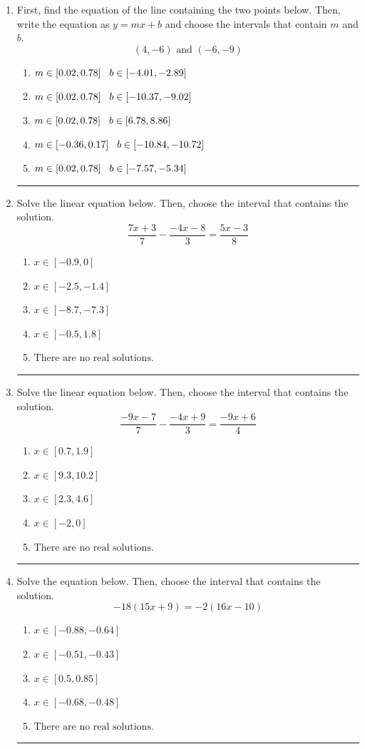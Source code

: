 \documentclass[14pt]{extbook}
\newcommand{\litem}[1]{\item#1\hspace*{-1cm}\rule{\textwidth}{0.4pt}}
\begin{document}
\begin{enumerate}
{\begin{enumerate}[label=\Alph*.]
\end{enumerate} }
\litem{
First, find the equation of the line containing the two points below. Then, write the equation as $ y=mx+b $ and choose the intervals that contain $m$ and $b$.\[ (4, -6) \text{ and } (-6, -9) \]\begin{enumerate}[label=\Alph*.]
\item \( m \in [0.02, 0.78] \hspace*{3mm} b \in [-4.01, -2.89] \)
\item \( m \in [0.02, 0.78] \hspace*{3mm} b \in [-10.37, -9.02] \)
\item \( m \in [0.02, 0.78] \hspace*{3mm} b \in [6.78, 8.86] \)
\item \( m \in [-0.36, 0.17] \hspace*{3mm} b \in [-10.84, -10.72] \)
\item \( m \in [0.02, 0.78] \hspace*{3mm} b \in [-7.57, -5.34] \)

\end{enumerate} }
\litem{
Solve the linear equation below. Then, choose the interval that contains the solution.\[ \frac{7x + 3}{7} - \frac{-4x -8}{3} = \frac{5x -3}{8} \]\begin{enumerate}[label=\Alph*.]
\item \( x \in [-0.9, 0] \)
\item \( x \in [-2.5, -1.4] \)
\item \( x \in [-8.7, -7.3] \)
\item \( x \in [-0.5, 1.8] \)
\item \( \text{There are no real solutions.} \)

\end{enumerate} }
\litem{
Solve the linear equation below. Then, choose the interval that contains the solution.\[ \frac{-9x -7}{7} - \frac{-4x + 9}{3} = \frac{-9x + 6}{4} \]\begin{enumerate}[label=\Alph*.]
\item \( x \in [0.7, 1.9] \)
\item \( x \in [9.3, 10.2] \)
\item \( x \in [2.3, 4.6] \)
\item \( x \in [-2, 0] \)
\item \( \text{There are no real solutions.} \)

\end{enumerate} }
\litem{
Solve the equation below. Then, choose the interval that contains the solution.\[ -18(15x + 9) = -2(16x -10) \]\begin{enumerate}[label=\Alph*.]
\item \( x \in [-0.88, -0.64] \)
\item \( x \in [-0.51, -0.43] \)
\item \( x \in [0.5, 0.85] \)
\item \( x \in [-0.68, -0.48] \)
\item \( \text{There are no real solutions.} \)

\end{enumerate} }
\end{enumerate}
\end{document}
